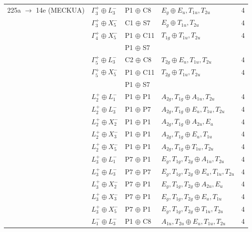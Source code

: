 \documentclass[preprint]{revtex4}
\begin{document}
\begin{table}[!ht]
\begin{tabular}{lllll}
225a $\rightarrow$ 14e (MECKUA) & $\Gamma_3^+ \oplus L_3^-$ & P1 $\oplus$ C8 & $E_g \oplus E_u,T_{1u},T_{2u}$ & 4 \\
& $\Gamma_3^+ \oplus X_5^-$ & C1 $\oplus$ S7 & $E_g \oplus T_{1u},T_{2u}$ & 4 \\
& $\Gamma_4^+ \oplus X_5^-$ & P1 $\oplus$ C11  & $T_{1g} \oplus T_{1u},T_{2u}$ & 4 \\
& & P1 $\oplus$ S7 \\
& $\Gamma_5^+ \oplus L_3^-$ & C2 $\oplus$ C8 & $T_{2g} \oplus E_u,T_{1u},T_{2u}$ & 4 \\
& $\Gamma_5^+ \oplus X_5^-$ & P1 $\oplus$ C11 & $T_{2g} \oplus T_{1u},T_{2u}$ & 4 \\
& & P1 $\oplus$ S7 & &  \\
& $L_2^+ \oplus L_1^-$ & P1 $\oplus$ P1 & $A_{2g},T_{1g} \oplus A_{1u},T_{2u}$ & 4 \\

& $L_2^+ \oplus L_3^-$ &  P1 $\oplus$ P7 & $A_{2g},T_{1g} \oplus E_u,T_{1u},T_{2u}$ & 4 \\

& $L_2^+ \oplus X_2^-$ &  P1 $\oplus$ P1 & $A_{2g},T_{1g} \oplus A_{2u},E_u$ & 4 \\

& $L_2^+ \oplus X_3^-$ &  P1 $\oplus$ P1 & $A_{2g},T_{1g} \oplus E_u,T_{1u}$ & 4 \\

& $L_2^+ \oplus X_5^-$ &  P1 $\oplus$ P1 & $A_{2g},T_{1g} \oplus T_{1u},T_{2u}$ & 4 \\

& $L_3^+ \oplus L_1^-$ &  P7 $\oplus$ P1 & $E_g,T_{1g},T_{2g} \oplus A_{1u},T_{2u}$ & 4 \\

& $L_3^+ \oplus L_3^-$ &  P7 $\oplus$ P7 & $E_g,T_{1g},T_{2g} \oplus E_u,T_{1u},T_{2u}$ & 4 \\

& $L_3^+ \oplus X_2^-$ &  P7 $\oplus$ P1 & $E_g,T_{1g},T_{2g} \oplus A_{2u},E_u$ & 4 \\

& $L_3^+ \oplus X_3^-$ &  P7 $\oplus$ P1 & $E_g,T_{1g},T_{2g} \oplus E_u,T_{1u}$ & 4 \\

& $L_3^+ \oplus X_5^-$ &  P7 $\oplus$ P1 & $E_g,T_{1g},T_{2g} \oplus T_{1u},T_{2u}$ & 4 \\

& $L_1^- \oplus L_3^-$ &  P1 $\oplus$ C8 & $A_{1u},T_{2u} \oplus E_u,T_{1u},T_{2u}$ & 4 \\


\end{tabular}
\end{table}
\end{document}
